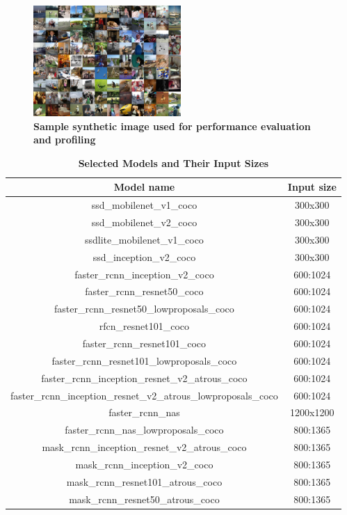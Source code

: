 \documentclass[conference]{IEEEtran}
\begin{document}
\begin{figure}[htpb]
	  \centering
	  \includegraphics[width=0.5\textwidth]{sample_image}
	  \caption{\textbf{Sample synthetic image used for  performance evaluation and profiling}}
	  \label{fig:sample_image}
\end{figure}

\begin{table}[b]
\caption{\bf Selected Models and Their Input Sizes}

\begin{tabular}{ c | c  }
Model name & Input size \\
\hline
ssd\_mobilenet\_v1\_coco & 300x300  \\
ssd\_mobilenet\_v2\_coco & 300x300  \\
ssdlite\_mobilenet\_v1\_coco & 300x300 \\
ssd\_inception\_v2\_coco & 300x300 \\
faster\_rcnn\_inception\_v2\_coco & 600:1024  \\
faster\_rcnn\_resnet50\_coco & 600:1024  \\
faster\_rcnn\_resnet50\_lowproposals\_coco & 600:1024 \\
rfcn\_resnet101\_coco & 600:1024\\
faster\_rcnn\_resnet101\_coco & 600:1024\\
faster\_rcnn\_resnet101\_lowproposals\_coco &  600:1024\\
faster\_rcnn\_inception\_resnet\_v2\_atrous\_coco	 &  600:1024\\
faster\_rcnn\_inception\_resnet\_v2\_atrous\_lowproposals\_coco & 600:1024\\
faster\_rcnn\_nas	&  1200x1200\\
faster\_rcnn\_nas\_lowproposals\_coco &  800:1365\\
mask\_rcnn\_inception\_resnet\_v2\_atrous\_coco & 800:1365 \\
mask\_rcnn\_inception\_v2\_coco	&  800:1365\\
mask\_rcnn\_resnet101\_atrous\_coco	&  800:1365\\
mask\_rcnn\_resnet50\_atrous\_coco &  800:1365\\
\end{tabular}
\label{tab:model_input_size}
\end{table}
\end{document}
